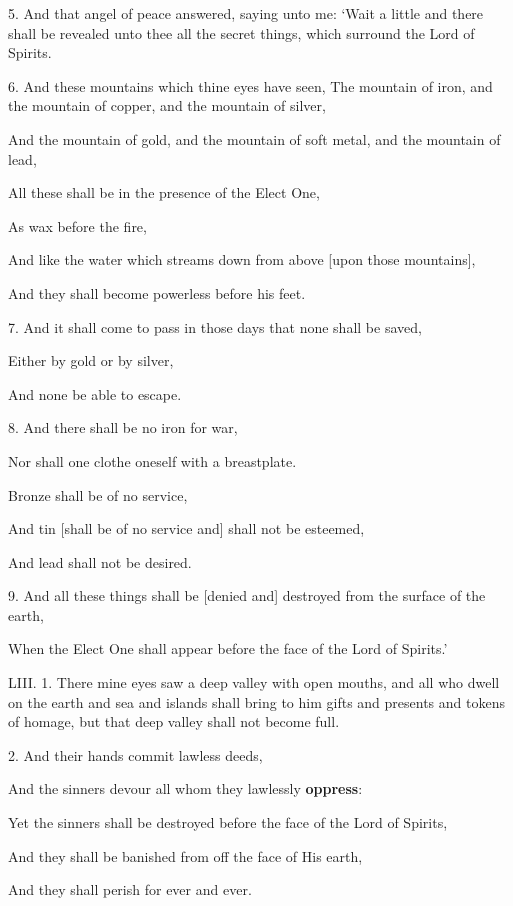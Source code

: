 5. And that angel of peace answered, saying unto
me: ‘Wait a little and there shall be revealed unto
thee all the secret things, which surround the Lord
of Spirits.

6. And these mountains which thine eyes have seen, The mountain of iron, and the mountain of copper, and the mountain of silver,

And the mountain of gold, and the mountain of soft metal, and the mountain of lead,

All these shall be in the presence of the Elect One,

As wax before the fire,

And like the water which streams down from above [upon those mountains],

And they shall become powerless before his feet.

7. And it shall come to pass in those days that none shall be saved,

Either by gold or by silver,

And none be able to escape.

8. And there shall be no iron for war,

Nor shall one clothe oneself with a breastplate.

Bronze shall be of no service,

And tin [shall be of no service and] shall not be esteemed,

And lead shall not be desired.

9. And all these things shall be [denied and] destroyed from the surface of the earth,

When the Elect One shall appear before the face of the Lord of Spirits.’


LIII. 1. There mine eyes saw a deep valley with
open mouths, and all who dwell on the earth and sea
and islands shall bring to him gifts and presents and
tokens of homage, but that deep valley shall not
become full.

2. And their hands commit lawless deeds,

And the sinners devour all whom they lawlessly \textbf{oppress}:

Yet the sinners shall be destroyed before the face of the Lord of Spirits,

And they shall be banished from off the face of His earth,

And they shall perish for ever and ever.

